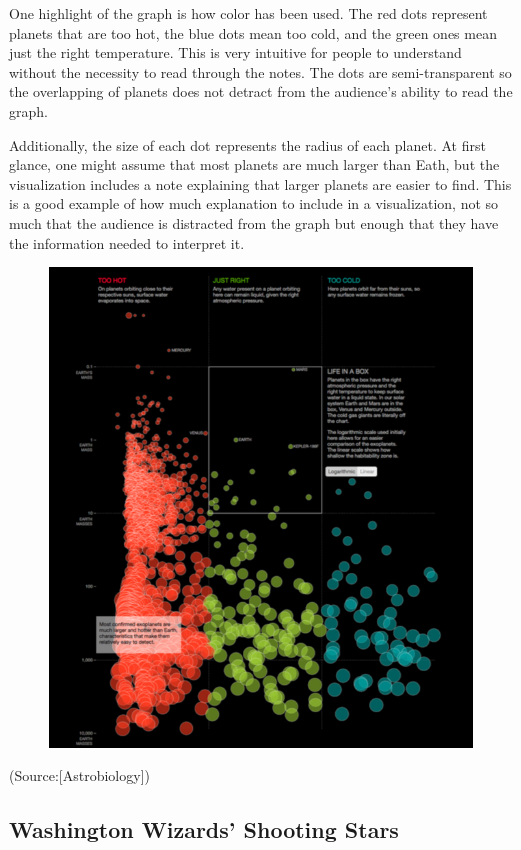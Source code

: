\documentclass[]{book}
\begin{document}
One highlight of the graph is how color has been used. The red dots
represent planets that are too hot, the blue dots mean too cold, and the
green ones mean just the right temperature. This is very intuitive for
people to understand without the necessity to read through the notes.
The dots are semi-transparent so the overlapping of planets does not
detract from the audience's ability to read the graph.

Additionally, the size of each dot represents the radius of each planet.
At first glance, one might assume that most planets are much larger than
Eath, but the visualization includes a note explaining that larger
planets are easier to find. This is a good example of how much
explanation to include in a visualization, not so much that the audience
is distracted from the graph but enough that they have the information
needed to interpret it.

\begin{figure}
\centering
\includegraphics{images/planet.png}
\caption{}
\end{figure}

(Source:{[}Astrobiology{]})

\subsection{Washington Wizards' Shooting
Stars}\label{washington-wizards-shooting-stars}
\end{document}
